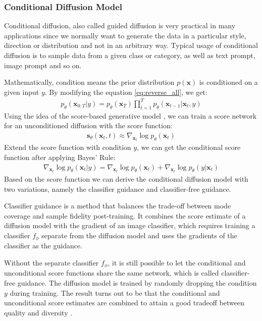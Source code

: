\documentclass[12pt,DIV14,BCOR12mm,a4paper,footinclude=false,headinclude,parskip=half-,twoside,openright,cleardoublepage=empty,toc=index,bibliography=totoc,listof=totoc]{scrreprt}
\numberwithin{equation}{chapter}
\begin{document}
\subsubsection{Conditional Diffusion Model}\label{sec:cond}
Conditional diffusion, also called guided diffusion is very practical in many applications since we normally want to generate the data in a particular style, direction or distribution and not in an arbitrary way. Typical usage of conditional diffusion is to sample data from a given class or category, as well as text prompt, image prompt and so on.

Mathematically, condition means the prior distribution $p(\mathbf{x})$ is conditioned on a given input $y$. By modifying the equation \ref{eq:reverse_all}, we get:
\begin{align}
  p_{\theta}(\mathbf{x}_{0:T}|y) = p_{\theta}(\mathbf{x}_{T})\prod_{t=1}^{T}p_{\theta}(\mathbf{x}_{t-1}|\mathbf{x}_{t},y)
\end{align}
Using the idea of the score-based generative model \cite{song2020generative}, we can train a score network for an unconditioned diffusion with the score function:
\begin{align}
  \mathbf{s}_{\theta}(\mathbf{x}_{t}, t)\approx \nabla _{\mathbf{x}_{t}}\log p_{\theta}(\mathbf{x}_{t})
\end{align}
Extend the score function with condition $y$, we can get the conditional score function after applying Bayes' Rule:
\begin{align}
  \nabla _{\mathbf{x}_{t}}\log p_{\theta}(\mathbf{x}_{t}|y)=\nabla _{\mathbf{x}_{t}}\log p_{\theta}(\mathbf{x}_{t}) + \nabla _{\mathbf{x}_{t}}\log p_{\theta}(y|\mathbf{x}_{t})
\end{align}
Based on the score function we can derive the conditional diffusion model with two variations, namely the classifier guidance and classifier-free guidance.

Classifier guidance is a method that balances the trade-off between mode coverage and sample fidelity post-training. It combines the score estimate of a diffusion model with the gradient of an image classifier, which requires training a classifier $f_{\phi}$ separate from the diffusion model and uses the gradients of the classifier as the guidance.

Without the separate classifier $f_{\phi}$, it is still possible to let the conditional and unconditional score functions share the same network, which is called classifier-free guidance. The diffusion model is trained by randomly dropping the condition $y$ during training. The result turns out to be that the conditional and unconditional score estimates are combined to attain a good tradeoff between quality and diversity \cite{ho2022classifierfree}.
\end{document}
